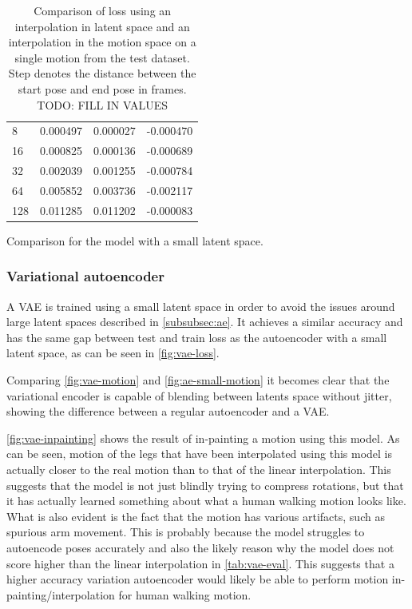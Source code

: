 \begin{table}[h]
\begin{subtable}[h]{0.45\textwidth}
\begin{tabular}{@{}llll@{}}
8 & 0.000497 & 0.000027 & -0.000470 \\
16 & 0.000825 & 0.000136 & -0.000689 \\
32 & 0.002039 & 0.001255 & -0.000784 \\
64 & 0.005852 & 0.003736 & -0.002117 \\
128 & 0.011285 & 0.011202 & -0.000083 \\  \bottomrule
        \end{tabular}
        \caption{Comparison for the model with a small latent space.}
        \label{tab:ae-eval-small}
    \end{subtable}
     \caption{Comparison of loss using an interpolation in latent space and an interpolation in the motion space on a single motion from the test dataset. Step denotes the distance between the start pose and end pose in frames. TODO: FILL IN VALUES}
     \label{tab:ae-eval}
\end{table}




\subsubsection{Variational autoencoder}\label{subsubsec:vae}
A VAE is trained using a small latent space in order to avoid the issues around large latent spaces described in \autoref{subsubsec:ae}. It achieves a similar accuracy and has the same gap between test and train loss as the autoencoder with a small latent space, as can be seen in \autoref{fig:vae-loss}.

Comparing \autoref{fig:vae-motion} and \autoref{fig:ae-small-motion} it becomes clear that the variational encoder is capable of blending between latents space without jitter, showing the difference between a regular autoencoder and a VAE.

\autoref{fig:vae-inpainting} shows the result of in-painting a motion using this model. As can be seen, motion of the legs that have been interpolated using this model is actually closer to the real motion than to that of the linear interpolation. This suggests that the model is not just blindly trying to compress rotations, but that it has actually learned something about what a human walking motion looks like. What is also evident is the fact that the motion has various artifacts, such as spurious arm movement. This is probably because the model struggles to autoencode poses accurately and also the likely reason why the model does not score higher than the linear interpolation in \autoref{tab:vae-eval}. This suggests that a higher accuracy variation autoencoder would likely be able to perform motion in-painting/interpolation for human walking motion.

